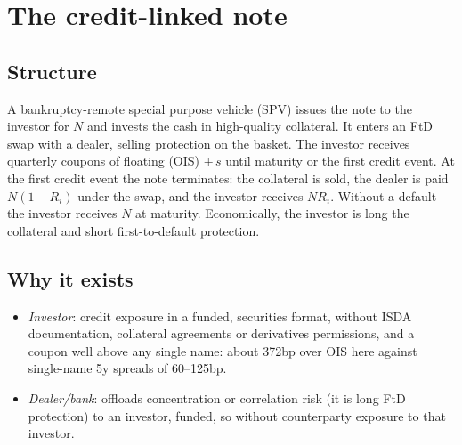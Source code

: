\documentclass[11pt,a4paper]{article}
\begin{document}
\section{The credit-linked note}
\subsection{Structure}
A bankruptcy-remote special purpose vehicle (SPV) issues the note to the investor for $N$ and invests the
cash in high-quality collateral. It enters an FtD swap with a dealer, selling protection on the basket.
The investor receives quarterly coupons of floating (OIS) $+\,s$ until maturity or the first credit event.
At the first credit event the note terminates: the collateral is sold, the dealer is paid $N(1-R_i)$
under the swap, and the investor receives $NR_i$. Without a default the investor receives $N$ at maturity.
Economically, the investor is long the collateral and short first-to-default protection.

\subsection{Why it exists}
\begin{itemize}[nosep]
\item \emph{Investor}: credit exposure in a funded, securities format, without ISDA documentation,
collateral agreements or derivatives permissions, and a coupon well above any single name: about 372bp
over OIS here against single-name 5y spreads of 60--125bp.
\item \emph{Dealer/bank}: offloads concentration or correlation risk (it is long FtD protection) to an
investor, funded, so without counterparty exposure to that investor.
\end{itemize}
\end{document}
